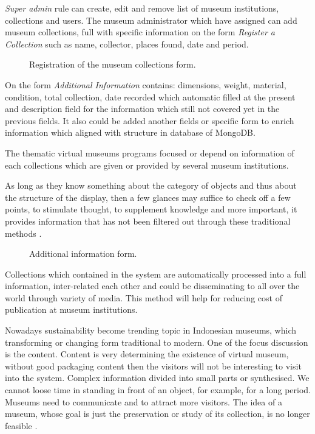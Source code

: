 \textit{Super admin} rule can create, edit and remove list of museum institutions, collections and users. The museum administrator which have assigned can add museum collections, full with specific information on the form \textit{Register a Collection} such as name, collector, places found, date and period.

\begin{figure}[ht]
	\caption{Registration of the museum collections form.}\label{fig:museumForm}
\end{figure}

On the form \textit{Additional Information} contains: dimensions, weight, material, condition, total collection, date recorded which automatic filled at the present and description field for the information which still not covered yet in the previous fields. It also could be added another fields or specific form to enrich information which aligned with structure in database of MongoDB.

The thematic virtual museums programs focused or depend on information of each collections which are given or provided by several museum institutions.

As long as they know something about the category of objects and thus about the structure of the display, then a few glances may suffice to check off a few points, to stimulate thought, to supplement knowledge and more important, it provides information that has not been filtered out through these traditional methods \cite{Schweibenz}.

\begin{figure}[ht]
	\caption{Additional information form.}\label{fig:additionalInfoForm}
\end{figure}

Collections which contained in the system are automatically processed into a full information, inter-related each other and could be disseminating to all over the world through variety of media. This method will help for reducing cost of publication at museum institutions.

Nowadays sustainability become trending topic in Indonesian museums, which transforming or changing form traditional to modern. One of the focus discussion is the content. Content is very determining the existence of virtual museum, without good packaging content then the visitors will not be interesting to visit into the system. Complex information divided into small parts or synthesised. We cannot loose time in standing in front of an object, for example, for a long period. Museums need to communicate and to attract more visitors. The idea of a museum, whose goal is just the preservation or study of its collection, is no longer feasible \cite{Pescarin}.

